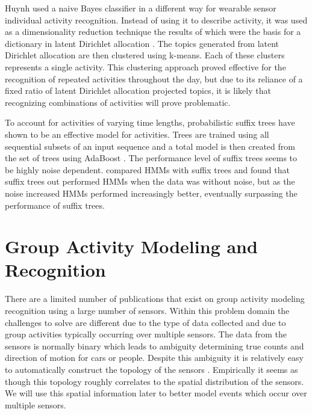 
Huynh \cite{Huynh2008} used a naive Bayes classifier in a different way for wearable sensor individual activity recognition.  Instead of using it to describe activity, it was used as a dimensionality reduction technique the results of which were the basis for a dictionary in latent Dirichlet allocation \cite{Blei2003}.  The topics generated from latent Dirichlet allocation are then clustered using k-means.  Each of these clusters represents a single activity.  This clustering approach proved effective for the recognition of repeated activities throughout the day, but due to its reliance of a fixed ratio of latent Dirichlet allocation projected topics, it is likely that recognizing combinations of activities will prove problematic.

To account for activities of varying time lengths, probabilistic suffix trees \cite{Hamid2007} have shown to be an effective model for activities.  Trees are trained using all sequential subsets of an input sequence and a total model is then created from the set of trees using AdaBoost \cite{Freund1996}.  The performance level of suffix trees seems to be highly noise dependent.  \cite{Hamid2006} compared HMMs with suffix trees and found that suffix trees out performed HMMs when the data was without noise, but as the noise increased HMMs performed increasingly better, eventually surpassing the performance of suffix trees.


\section{Group Activity Modeling and Recognition}
There are a limited number of publications that exist on group activity modeling recognition using a large number of sensors.  Within this problem domain the challenges to solve are different due to the type of data collected and due to group activities typically occurring over multiple sensors.  The data from the sensors is normally binary which leads to ambiguity determining true counts and direction of motion for cars or people.  Despite this ambiguity it is relatively easy to automatically construct the topology of the sensors \cite{Wren2003, Wren2006a}.  Empirically it seems as though this topology roughly correlates to the spatial distribution of the sensors.  We will use this spatial information later to better model events which occur over multiple sensors.
	
